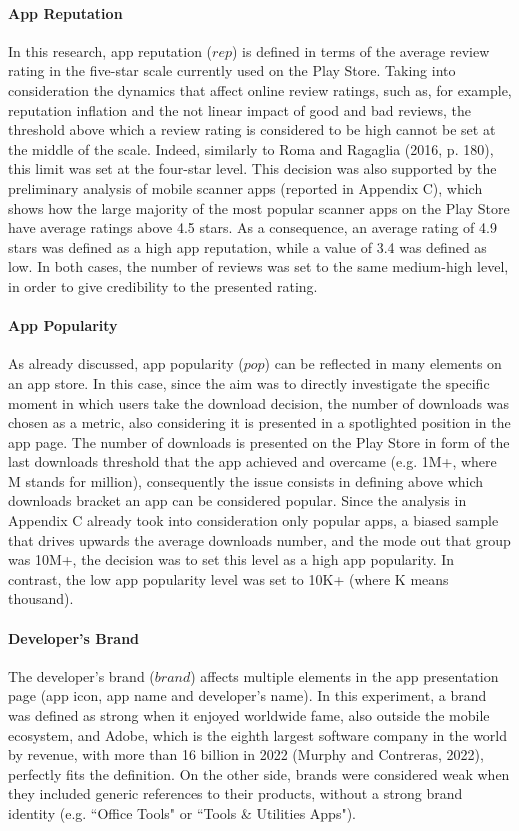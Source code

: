 \paragraph{App Reputation}
In this research, app reputation ($rep$) is defined in terms of the average review rating in the five-star scale currently used on the Play Store. Taking into consideration the dynamics that affect online review ratings, such as, for example, reputation inflation and the not linear impact of good and bad reviews, the threshold above which a review rating is considered to be high cannot be set at the middle of the scale. Indeed, similarly to Roma and Ragaglia (2016, p. 180), this limit was set at the four-star level. This decision was also supported by the preliminary analysis of mobile scanner apps (reported in Appendix C), which shows how the large majority of the most popular scanner apps on the Play Store have average ratings above 4.5 stars. As a consequence, an average rating of 4.9 stars was defined as a high app reputation, while a value of 3.4 was defined as low. In both cases, the number of reviews was set to the same medium-high level, in order to give credibility to the presented rating.



\paragraph{App Popularity}
As already discussed, app popularity ($pop$) can be reflected in many elements on an app store. In this case, since the aim was to directly investigate the specific moment in which users take the download decision, the number of downloads was chosen as a metric, also considering it is presented in a spotlighted position in the app page. The number of downloads is presented on the Play Store in form of the last downloads threshold that the app achieved and overcame (e.g. 1M+, where M stands for million), consequently the issue consists in defining above which downloads bracket an app can be considered popular. Since the analysis in Appendix C already took into consideration only popular apps, a biased sample that drives upwards the average downloads number, and the mode out that group was 10M+, the decision was to set this level as a high app popularity. In contrast, the low app popularity level was set to 10K+ (where K means thousand).

\paragraph{Developer's Brand}
The developer's brand ($brand$) affects multiple elements in the app presentation page (app icon, app name and developer's name). In this experiment, a brand was defined as strong when it enjoyed worldwide fame, also outside the mobile ecosystem, and Adobe, which is the eighth largest software company in the world by revenue, with more than 16 billion in 2022 (Murphy and Contreras, 2022), perfectly fits the definition. On the other side, brands were considered weak when they included generic references to their products, without a strong brand identity (e.g. ``Office Tools" or ``Tools \& Utilities Apps").

